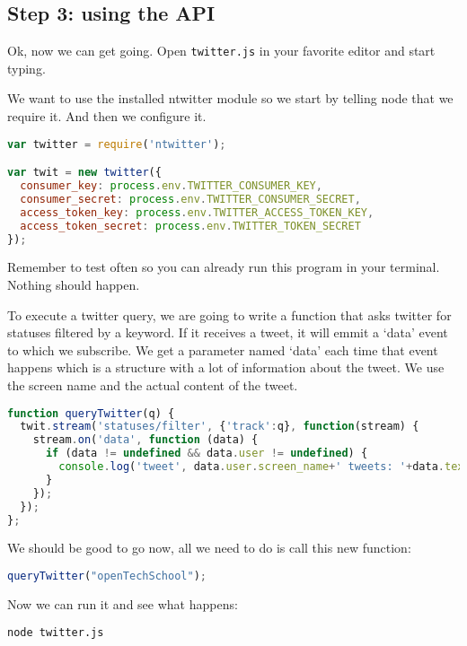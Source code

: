 \documentclass[a4paper]{report}
\begin{document}
\subsection*{Step 3: using the API}
Ok, now we can get going. Open \texttt{twitter.js} in your favorite editor and start typing.

We want to use the installed ntwitter module so we start by telling node that we require it. And then we configure it.

\begin{lstlisting}[language=JavaScript]
var twitter = require('ntwitter');

var twit = new twitter({
  consumer_key: process.env.TWITTER_CONSUMER_KEY,
  consumer_secret: process.env.TWITTER_CONSUMER_SECRET,
  access_token_key: process.env.TWITTER_ACCESS_TOKEN_KEY,
  access_token_secret: process.env.TWITTER_TOKEN_SECRET
});
\end{lstlisting}

\noindent Remember to test often so you can already run this program in your terminal. Nothing should happen.

\noindent To execute a twitter query, we are going to write a function that asks twitter for statuses filtered by a keyword. If it receives a tweet, it will emmit a `data' event to which we subscribe. We get a parameter named `data' each time that event happens which is a structure with a lot of information about the tweet. We use the screen name and the actual content of the tweet.

\begin{lstlisting}[language=JavaScript]
function queryTwitter(q) { 
  twit.stream('statuses/filter', {'track':q}, function(stream) {
    stream.on('data', function (data) {
      if (data != undefined && data.user != undefined) {
        console.log('tweet', data.user.screen_name+' tweets: '+data.text);
      }
    });
  });
};
\end{lstlisting}

\noindent We should be good to go now, all we need to do is call this new function:

\begin{lstlisting}[language=JavaScript]
queryTwitter("openTechSchool");
\end{lstlisting}

\noindent Now we can run it and see what happens:
\begin{lstlisting}[language=bash]
node twitter.js
\end{lstlisting}
\end{document}
